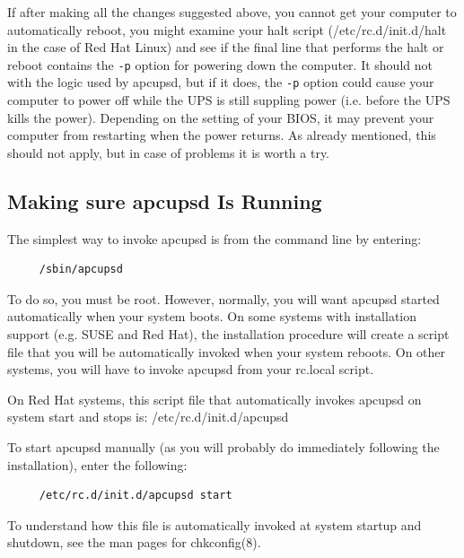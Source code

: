 If after making all the changes suggested above, you cannot get your computer
to automatically reboot, you might examine your halt script
(/etc/rc.d/init.d/halt in the case of Red Hat Linux) and see if the final line
that performs the halt or reboot contains the {\tt -p} option for powering
down the computer. It should not with the logic used by apcupsd, but if it
does, the {\tt -p} option could cause your computer to power off while the UPS
is still suppling power (i.e. before the UPS kills the power).  Depending on
the setting of your BIOS, it may prevent your computer from restarting when
the power returns. As already mentioned, this should not apply, but in case of
problems it is worth a try. 

\label{Making-sure-apcupsd-Is-Running}

\subsection*{Making sure apcupsd Is Running}

\label{index-Checking-running-62}
The simplest way to invoke apcupsd is from the command line by entering: 

\footnotesize
\begin{verbatim}
     /sbin/apcupsd
\end{verbatim}
\normalsize

To do so, you must be root. However, normally, you will want apcupsd started
automatically when your system boots. On some systems with installation
support (e.g. SUSE and Red Hat), the installation procedure will create a
script file that you will be automatically invoked when your system reboots.
On other systems, you will have to invoke apcupsd from your rc.local script.  

On Red Hat systems, this script file that automatically invokes apcupsd on
system start and stops is: /etc/rc.d/init.d/apcupsd  

To start apcupsd manually (as you will probably do immediately following the
installation), enter the following: 

\footnotesize
\begin{verbatim}
     /etc/rc.d/init.d/apcupsd start
\end{verbatim}
\normalsize

To understand how this file is automatically invoked at system startup and
shutdown, see the man pages for chkconfig(8).  

